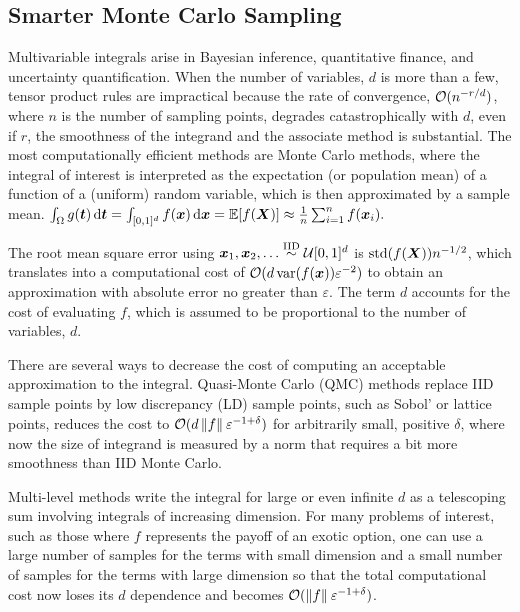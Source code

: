 \subsection{Smarter Monte Carlo Sampling}

Multivariable integrals arise in Bayesian inference, quantitative finance, and uncertainty quantification.  When the number of variables, $d$ is more than a few, tensor product rules are impractical because the rate of convergence, $\mathcal{O}(n^{-r/d})$, where $n$ is the number of sampling points, degrades catastrophically with $d$, even if $r$, the smoothness of the integrand and the associate method is substantial.  The most computationally efficient methods are Monte Carlo methods, where the integral of interest is interpreted as the expectation (or population mean) of a function of a (uniform) random variable, which is then approximated by a sample mean.
$
    \int_{\Omega} g({\boldsymbol{t}}) \, \textup{d} {\boldsymbol{t}} = \int_{[0,1]^d} f({\boldsymbol{x}}) \, \textup{d} {\boldsymbol{x}} = \mathbb{E}[f({\boldsymbol{X}})] \approx \frac 1n \sum_{i=1}^n f({\boldsymbol{x}}_i).
$

The root mean square error using ${\boldsymbol{x}}_1, {\boldsymbol{x}}_2, \ldots \overset{\text{IID}}{\sim} {\mathcal{U}}[0,1]^d$ is $\operatorname{std}(f({\boldsymbol{X}})) n^{-1/2}$, which translates into a computational cost of $\mathcal{O}(d\operatorname{var}(f({\boldsymbol{x}}))\varepsilon^{-2})$ to obtain an approximation with absolute error no greater than $\varepsilon$. The term $d$ accounts for the cost of evaluating $f$, which is assumed to be proportional to the number of variables, $d$.

There are several ways to decrease the cost of computing an acceptable approximation to the integral.  Quasi-Monte Carlo (QMC) methods \cite{DicEtal14a} replace IID sample points by low discrepancy (LD) sample points, such as Sobol' or lattice points, reduces the cost to $\mathcal{O}(d\left \lVert f \right \rVert_{{}}\varepsilon^{-1+\delta})$ for arbitrarily small, positive $\delta$, where now the size of integrand is measured by a norm that requires a bit more smoothness than IID Monte Carlo. 

Multi-level methods write the integral for large or even infinite $d$ as a telescoping sum involving integrals of increasing dimension. 
For many problems of interest, such as those where $f$ represents the payoff of an exotic option, one can use a large number of samples for the terms with small dimension and a small number of samples for the terms with large dimension so that the total computational cost now loses its $d$ dependence and becomes $\mathcal{O}(\left \lVert f \right \rVert_{{}}\varepsilon^{-1+\delta})$.
 
